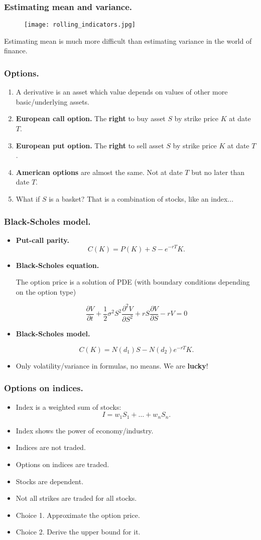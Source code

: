 \documentclass{beamer}
\begin{document}
\begin{frame}[fragile]
\frametitle{Estimating mean and variance.}
\begin{figure}[h!]
\centering
\texttt{[image: rolling\_indicators.jpg]}
\end{figure}
Estimating mean is much more difficult than estimating variance in the world of finance.
\end{frame}
\begin{frame}[fragile]
\frametitle{Options.}
\begin{enumerate}
	\item A derivative is an asset which value depends on values of other more basic/underlying assets.
	\item \textbf{European call option.} The \textbf{right} to buy asset $S$ by strike price $K$ at date $T$. 
	\item \textbf{European put option.} The \textbf{right} to sell asset $S$ by strike price $K$ at date $T$.
	\item \textbf{American options} are almost the same. Not at date $T$ but no later than date $T$.
	\item What if $S$ is a basket? That is a combination of stocks, like an index...
\end{enumerate}
\end{frame}
\begin{frame}
\frametitle{Black-Scholes model.}
\begin{itemize}
\item \textbf{Put-call parity.}
$$C(K) = P(K) + S - e^{-rT}K.$$
\item \textbf{Black-Scholes equation.}

The option price is a solution of PDE (with boundary conditions depending on the option type)

$$\frac{\partial V}{\partial t} + \frac{1}{2}\sigma^2S^2\frac{\partial^2 V}{\partial S^2}
+ rS\frac{\partial V}{\partial S} - rV=0$$

\item \textbf{Black-Scholes model.}

$$C(K) = N(d_1)S - N(d_2)e^{-rT}K.$$
\item Only volatility/variance in formulas, no means. We are \textbf{lucky}!
\end{itemize}
\end{frame}
\begin{frame}
\frametitle{Options on indices.}
\begin{itemize}
	\item Index is a weighted sum of stocks:
	$$I = w_1S_1 + \ldots + w_n S_n.$$
	\item Index shows the power of economy/industry.
	\item Indices are not traded.
	\item Options on indices are traded.
	\item Stocks are dependent.
	\item Not all strikes are traded for all stocks.
	\item Choice 1. Approximate the option price.
	\item Choice 2. Derive the upper bound for it.
\end{itemize}
\end{frame}
\end{document}
